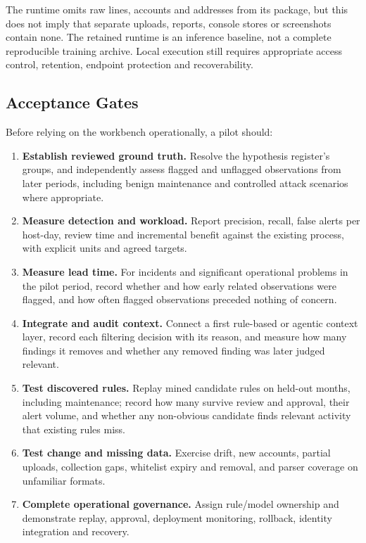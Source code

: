 \documentclass[11pt,a4paper]{article}
\begin{document}
The runtime omits raw lines, accounts and addresses from its package, but this does not imply that separate uploads, reports, console stores or screenshots contain none. The retained runtime is an inference baseline, not a complete reproducible training archive. Local execution still requires appropriate access control, retention, endpoint protection and recoverability.

\subsection{Acceptance Gates}

Before relying on the workbench operationally, a pilot should:
\begin{enumerate}
\item \textbf{Establish reviewed ground truth.} Resolve the hypothesis register's groups, and independently assess flagged and unflagged observations from later periods, including benign maintenance and controlled attack scenarios where appropriate.
\item \textbf{Measure detection and workload.} Report precision, recall, false alerts per host-day, review time and incremental benefit against the existing process, with explicit units and agreed targets.
\item \textbf{Measure lead time.} For incidents and significant operational problems in the pilot period, record whether and how early related observations were flagged, and how often flagged observations preceded nothing of concern.
\item \textbf{Integrate and audit context.} Connect a first rule-based or agentic context layer, record each filtering decision with its reason, and measure how many findings it removes and whether any removed finding was later judged relevant.
\item \textbf{Test discovered rules.} Replay mined candidate rules on held-out months, including maintenance; record how many survive review and approval, their alert volume, and whether any non-obvious candidate finds relevant activity that existing rules miss.
\item \textbf{Test change and missing data.} Exercise drift, new accounts, partial uploads, collection gaps, whitelist expiry and removal, and parser coverage on unfamiliar formats.
\item \textbf{Complete operational governance.} Assign rule/model ownership and demonstrate replay, approval, deployment monitoring, rollback, identity integration and recovery.
\end{enumerate}
\end{document}
